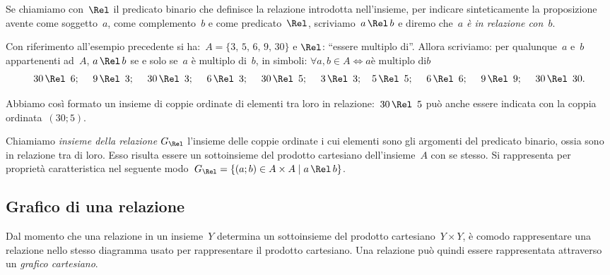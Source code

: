 \ovalbox{\risolvi \ref{ese:7.2}}\vspazio

Se chiamiamo con~$\Rel$ il predicato binario che definisce la relazione introdotta nell'insieme, per indicare 
sinteticamente la proposizione avente come soggetto~$a$, come complemento~$b$ e come predicato~$\Rel$, scriviamo~$a \,\Rel\, b$ e
diremo che~\emph{$a$ è in relazione con~$b$}.

\begin{exrig}
 \begin{esempio}

Con riferimento all'esempio precedente si ha:~$A = \{3\text{,~}5\text{,~}6\text{,~}9\text{,~}30\}$ e $\Rel$:
``essere multiplo di''. Allora scriviamo: per qualunque~$a$ e~$b$ appartenenti ad~$A$,
$a \,\Rel\, b$ se e solo se~$a$ è multiplo di~$b$, in simboli: $\forall a,b \in A \Leftrightarrow a \text{è multiplo di} b$
\[30 \,\Rel\,~6;\quad~9 \,\Rel\,~3;\quad~30 \,\Rel\,~3;\quad~6 \,\Rel\,~3;\quad~30 \,\Rel\,~5;\quad~3 \,\Rel\,~3;\quad 5 \,\Rel\,~5;\quad~6 \,\Rel\,~6;\quad~9 \,\Rel\,~9;\quad~30 \,\Rel\,~30.\]

Abbiamo così formato un insieme di coppie ordinate di elementi tra loro in relazione:~$30 \,\Rel\,~5$ può anche essere indicata con la coppia ordinata~$(30;5)$.
\end{esempio}
\end{exrig}

\begin{definizione}
Chiamiamo \emph{insieme della relazione} $G_\Rel$ l'insieme delle coppie ordinate i cui
elementi sono gli argomenti del predicato binario, ossia sono in relazione tra di loro. Esso risulta essere un
sottoinsieme del prodotto cartesiano dell'insieme~$A$ con se stesso. Si rappresenta per proprietà caratteristica nel
seguente modo~$G_\Rel = \{(a;b) \in A \times A \mid  a \,\Rel\, b \}$.
\end{definizione}

\ovalbox{\risolvii \ref{ese:7.3}, \ref{ese:7.4}, \ref{ese:7.5}, \ref{ese:7.6}}
\subsection{Grafico di una relazione}

Dal momento che una relazione in un insieme~$Y$ determina un sottoinsieme del prodotto cartesiano~$Y \times Y$, è
comodo rappresentare una relazione nello stesso diagramma usato per rappresentare il prodotto cartesiano.
Una relazione può quindi essere rappresentata attraverso un \emph{grafico cartesiano}.

